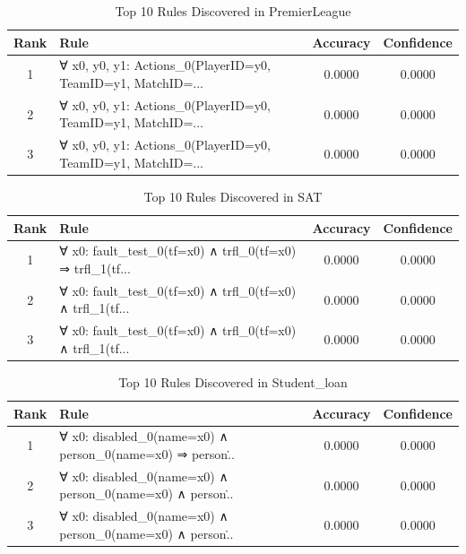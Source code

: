 \documentclass[11pt,a4paper]{article}
\begin{document}
\begin{table}[h!]
\centering
\small
\caption{Top 10 Rules Discovered in PremierLeague}
\label{tab:rules_PremierLeague}
\begin{tabular}{|c|p{5cm}|c|c|}
\hline
\textbf{Rank} & \textbf{Rule} & \textbf{Accuracy} & \textbf{Confidence} \\
\hline
1 & ∀ x0, y0, y1: Actions\_0(PlayerID=y0, TeamID=y1, MatchID=... & 0.0000 & 0.0000 \\
2 & ∀ x0, y0, y1: Actions\_0(PlayerID=y0, TeamID=y1, MatchID=... & 0.0000 & 0.0000 \\
3 & ∀ x0, y0, y1: Actions\_0(PlayerID=y0, TeamID=y1, MatchID=... & 0.0000 & 0.0000 \\
\hline
\end{tabular}
\end{table}

\begin{table}[h!]
\centering
\small
\caption{Top 10 Rules Discovered in SAT}
\label{tab:rules_SAT}
\begin{tabular}{|c|p{5cm}|c|c|}
\hline
\textbf{Rank} & \textbf{Rule} & \textbf{Accuracy} & \textbf{Confidence} \\
\hline
1 & ∀ x0: fault\_test\_0(tf=x0) ∧ trfl\_0(tf=x0) ⇒ trfl\_1(tf... & 0.0000 & 0.0000 \\
2 & ∀ x0: fault\_test\_0(tf=x0) ∧ trfl\_0(tf=x0) ∧ trfl\_1(tf... & 0.0000 & 0.0000 \\
3 & ∀ x0: fault\_test\_0(tf=x0) ∧ trfl\_0(tf=x0) ∧ trfl\_1(tf... & 0.0000 & 0.0000 \\
\hline
\end{tabular}
\end{table}

\begin{table}[h!]
\centering
\small
\caption{Top 10 Rules Discovered in Student_loan}
\label{tab:rules_Studentloan}
\begin{tabular}{|c|p{5cm}|c|c|}
\hline
\textbf{Rank} & \textbf{Rule} & \textbf{Accuracy} & \textbf{Confidence} \\
\hline
1 & ∀ x0: disabled\_0(name=x0) ∧ person\_0(name=x0) ⇒ person\... & 0.0000 & 0.0000 \\
2 & ∀ x0: disabled\_0(name=x0) ∧ person\_0(name=x0) ∧ person\... & 0.0000 & 0.0000 \\
3 & ∀ x0: disabled\_0(name=x0) ∧ person\_0(name=x0) ∧ person\... & 0.0000 & 0.0000 \\
\hline
\end{tabular}
\end{table}
\end{document}
